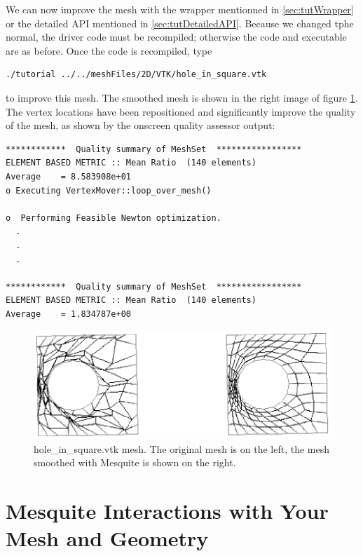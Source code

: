 \documentclass[letter]{report}
\begin{document}
We can now improve the mesh with the wrapper mentionned in
\ref{sec:tutWrapper} or the detailed API mentioned in
\ref{sec:tutDetailedAPI}. 
Because we changed tphe normal, the driver code must be recompiled;
otherwise the code and executable are as before.
Once the code is recompiled, type 
\begin{verbatim}
./tutorial ../../meshFiles/2D/VTK/hole_in_square.vtk
\end{verbatim}
to improve this mesh.
The smoothed mesh is shown in the right image of figure
\ref{fig:hole}.
The vertex locations have been repositioned and significantly improve
the quality of the mesh, as shown by the onscreen
quality assessor output: 
\begin{verbatim}
************  Quality summary of MeshSet  *****************
ELEMENT BASED METRIC :: Mean Ratio  (140 elements)
Average    = 8.583908e+01
o Executing VertexMover::loop_over_mesh()

o  Performing Feasible Newton optimization.
  .
  .
  .

************  Quality summary of MeshSet  *****************
ELEMENT BASED METRIC :: Mean Ratio  (140 elements)
Average    = 1.834787e+00
\end{verbatim}
\begin{figure}[htbp]
\begin{center}
    \includegraphics{hole_in_square.ps}
    \caption{hole\_in\_square.vtk mesh. The original mesh is on the left, the mesh smoothed with
    Mesquite is shown on the right.}
    \label{fig:hole}
\end{center}
\end{figure}


\chapter{Mesquite Interactions with Your Mesh and Geometry}
\label{sec:meshes}
\end{document}
